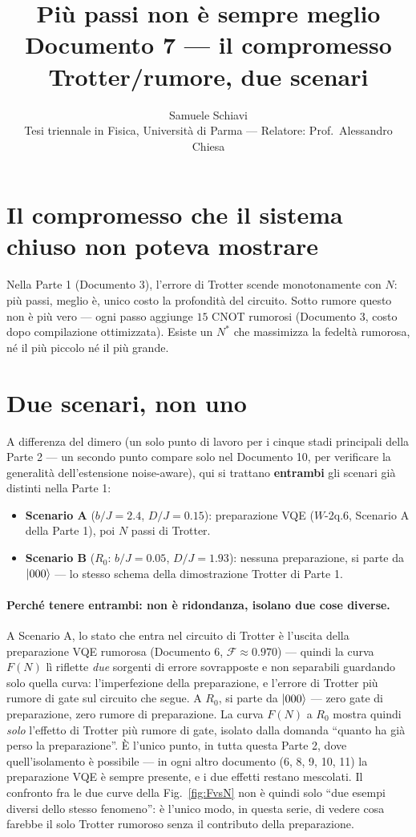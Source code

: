 \documentclass[11pt,a4paper]{article}
\title{\bfseries Più passi non è sempre meglio\\[2pt]
\large Documento 7 --- il compromesso Trotter/rumore, due scenari}
\author{Samuele Schiavi \\ \small Tesi triennale in Fisica, Università di Parma
--- Relatore: Prof.\ Alessandro Chiesa}
\date{}
\begin{document}
\maketitle
\thispagestyle{fancy}

\section{Il compromesso che il sistema chiuso non poteva mostrare}

Nella Parte 1 (Documento 3), l'errore di Trotter scende monotonamente con
$N$: più passi, meglio è, unico costo la profondità del circuito. Sotto
rumore questo non è più vero --- ogni passo aggiunge $15$ CNOT rumorosi
(Documento 3, costo dopo compilazione ottimizzata). Esiste un $N^*$ che
massimizza la fedeltà rumorosa, né il più piccolo né il più grande.

\section{Due scenari, non uno}

A differenza del dimero (un solo punto di lavoro per i cinque stadi
principali della Parte 2 --- un secondo punto compare solo nel Documento
10, per verificare la generalità dell'estensione noise-aware), qui
si trattano \textbf{entrambi} gli scenari già distinti nella Parte 1:

\begin{itemize}[leftmargin=1.8em,itemsep=3pt]
\item \textbf{Scenario A} ($b/J=2.4$, $D/J=0.15$): preparazione VQE
($W$-2q.6, Scenario A della Parte 1), poi $N$ passi di Trotter.
\item \textbf{Scenario B} ($R_0$: $b/J=0.05$, $D/J=1.93$): nessuna
preparazione, si parte da $\lvert 000\rangle$ --- lo stesso schema della
dimostrazione Trotter di Parte 1.
\end{itemize}

\paragraph{Perché tenere entrambi: non è ridondanza, isolano due cose
diverse.} A Scenario A, lo stato che entra nel circuito di Trotter è
l'uscita della preparazione VQE rumorosa (Documento 6, $\mathcal
F\approx0.970$) --- quindi la curva $F(N)$ lì riflette \emph{due} sorgenti
di errore sovrapposte e non separabili guardando solo quella curva:
l'imperfezione della preparazione, e l'errore di Trotter più rumore di
gate sul circuito che segue. A $R_0$, si parte da $\lvert 000\rangle$ --- zero
gate di preparazione, zero rumore di preparazione. La curva $F(N)$ a
$R_0$ mostra quindi \emph{solo} l'effetto di Trotter più rumore di gate,
isolato dalla domanda ``quanto ha già perso la preparazione''. È l'unico
punto, in tutta questa Parte 2, dove quell'isolamento è possibile ---
in ogni altro documento (6, 8, 9, 10, 11) la preparazione VQE è sempre
presente, e i due effetti restano mescolati. Il confronto fra le due
curve della Fig.~\ref{fig:FvsN} non è quindi solo ``due esempi diversi
dello stesso fenomeno'': è l'unico modo, in questa serie, di vedere cosa
farebbe il solo Trotter rumoroso senza il contributo della preparazione.
\end{document}
